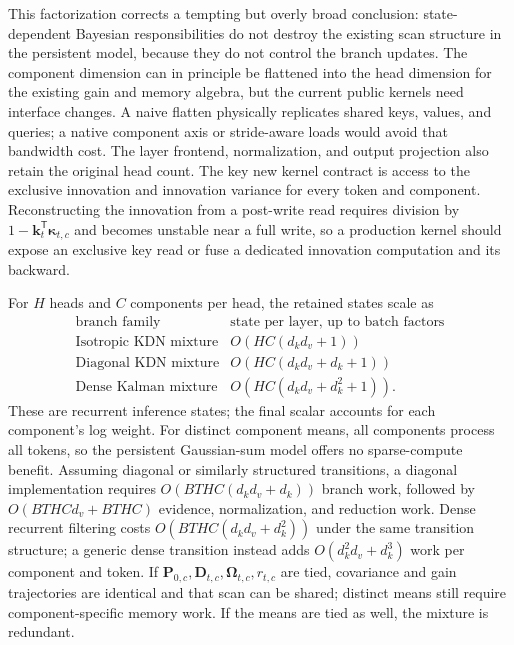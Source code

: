 \documentclass[11pt]{article}
\newcommand{\ve}[1]{\boldsymbol{#1}}
\newcommand{\tr}{\mathsf{T}}
\begin{document}
This factorization corrects a tempting but overly broad conclusion: state-dependent Bayesian
responsibilities do not destroy the existing scan structure in the persistent model, because
they do not control the branch updates.  The component dimension can in principle be flattened
into the head dimension for the existing gain and memory algebra, but the current public kernels
need interface changes.  A naive flatten physically replicates shared keys, values, and queries;
a native component axis or stride-aware loads would avoid that bandwidth cost.  The layer
frontend, normalization, and output projection also retain the original head count.  The key new
kernel contract is access to the exclusive innovation and innovation variance for every token and
component.  Reconstructing the innovation from a post-write read requires division by
$1-\ve{k}_t^{\tr}\ve{\kappa}_{t,c}$ and becomes unstable near a full write, so a production kernel
should expose an exclusive key read or fuse a dedicated innovation computation and its backward.

For $H$ heads and $C$ components per head, the retained states scale as
\begin{equation}
\begin{array}{c|c}
  \text{branch family} & \text{state per layer, up to batch factors}\\
  \hline
  \text{Isotropic KDN mixture} & O(HC(d_kd_v+1))\\
  \text{Diagonal KDN mixture} & O(HC(d_kd_v+d_k+1))\\
  \text{Dense Kalman mixture} & O(HC(d_kd_v+d_k^2+1)).
\end{array}
  \label{eq:kdn3-state-cost}
\end{equation}
These are recurrent inference states; the final scalar accounts for each component's log weight.
For distinct component means, all components process all tokens, so the persistent Gaussian-sum
model offers no sparse-compute benefit.  Assuming diagonal or similarly structured transitions,
a diagonal implementation requires
$O(BTHC(d_kd_v+d_k))$ branch work, followed by
$O(BTHCd_v+BTHC)$ evidence, normalization, and reduction work.  Dense recurrent filtering costs
$O(BTHC(d_kd_v+d_k^2))$ under the same transition structure; a generic dense transition instead
adds $O(d_k^2d_v+d_k^3)$ work per component and token.  If
$\ve{P}_{0,c},\ve{D}_{t,c},\ve{\Omega}_{t,c},r_{t,c}$ are tied, covariance and gain trajectories
are identical and that scan can be shared; distinct means still require component-specific memory
work.  If the means are tied as well, the mixture is redundant.
\end{document}
